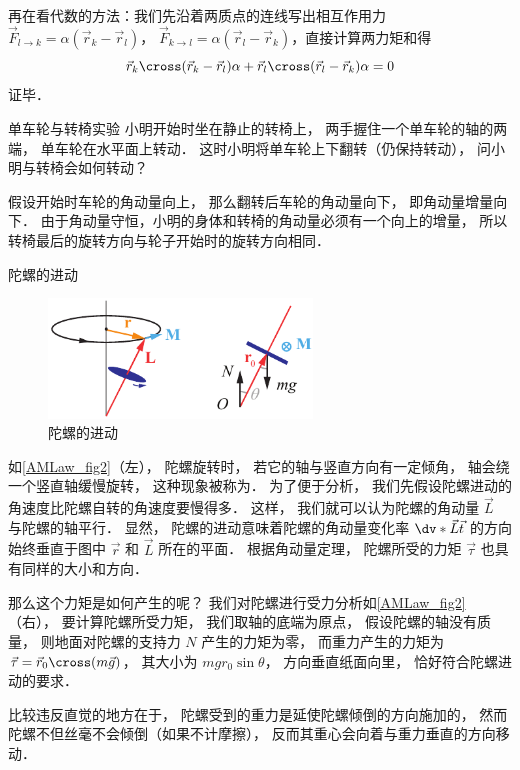 再在看代数的方法：我们先沿着两质点的连线写出相互作用力 $\vec F_{l\to k} = \alpha(\vec r_k - \vec r_l)$， $\vec F_{k\to l} = \alpha(\vec r_l - \vec r_k)$，直接计算两力矩和得
\begin{equation}
\vec r_k \cross (\vec r_k - \vec r_l)\alpha + \vec r_l \cross (\vec r_l - \vec r_k)\alpha = 0
\end{equation}
证毕．

\begin{exam}{单车轮与转椅实验}
小明开始时坐在静止的转椅上， 两手握住一个单车轮的轴的两端， 单车轮在水平面上转动． 这时小明将单车轮上下翻转（仍保持转动）， 问小明与转椅会如何转动？

假设开始时车轮的角动量向上， 那么翻转后车轮的角动量向下， 即角动量增量向下． 由于角动量守恒，小明的身体和转椅的角动量必须有一个向上的增量， 所以转椅最后的旋转方向与轮子开始时的旋转方向相同．
\end{exam}

\begin{exam}{陀螺的进动}\label{AMLaw_ex2}
\begin{figure}[ht]
\centering
\includegraphics[width=7cm]{./figures/AMLaw2.pdf}
\caption{陀螺的进动}\label{AMLaw_fig2}
\end{figure}
如\autoref{AMLaw_fig2}（左）， 陀螺旋转时， 若它的轴与竖直方向有一定倾角， 轴会绕一个竖直轴缓慢旋转， 这种现象被称为． 为了便于分析， 我们先假设陀螺进动的角速度比陀螺自转的角速度要慢得多． 这样， 我们就可以认为陀螺的角动量 $\vec L$ 与陀螺的轴平行． 显然， 陀螺的进动意味着陀螺的角动量变化率 $\dv*{\vec L}{\vec t}$ 的方向始终垂直于图中 $\vec r$ 和 $\vec L$ 所在的平面． 根据角动量定理， 陀螺所受的力矩 $\vec \tau$ 也具有同样的大小和方向．

那么这个力矩是如何产生的呢？ 我们对陀螺进行受力分析如\autoref{AMLaw_fig2}（右）， 要计算陀螺所受力矩， 我们取轴的底端为原点， 假设陀螺的轴没有质量， 则地面对陀螺的支持力 $N$ 产生的力矩为零， 而重力产生的力矩为 $\vec \tau = \vec r_0 \cross (m\vec g)$， 其大小为 $mgr_0\sin\theta$， 方向垂直纸面向里， 恰好符合陀螺进动的要求．

比较违反直觉的地方在于， 陀螺受到的重力是延使陀螺倾倒的方向施加的， 然而陀螺不但丝毫不会倾倒（如果不计摩擦）， 反而其重心会向着与重力垂直的方向移动．
\end{exam}

